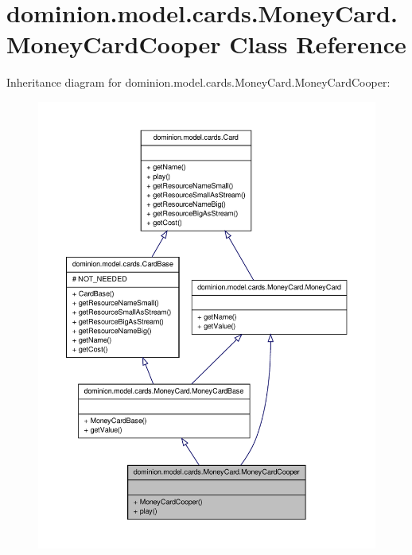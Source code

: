 \hypertarget{classdominion_1_1model_1_1cards_1_1MoneyCard_1_1MoneyCardCooper}{\section{dominion.\-model.\-cards.\-Money\-Card.\-Money\-Card\-Cooper \-Class \-Reference}
\label{classdominion_1_1model_1_1cards_1_1MoneyCard_1_1MoneyCardCooper}
}


\-Inheritance diagram for dominion.\-model.\-cards.\-Money\-Card.\-Money\-Card\-Cooper\-:
\nopagebreak
\begin{figure}[H]
\begin{center}
\leavevmode
\includegraphics[width=350pt]{classdominion_1_1model_1_1cards_1_1MoneyCard_1_1MoneyCardCooper__inherit__graph}
\end{center}
\end{figure}


